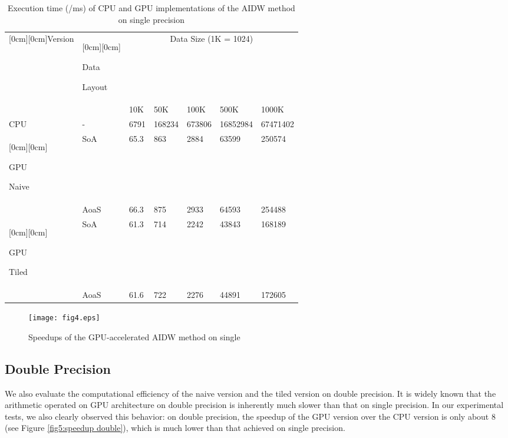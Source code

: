\documentclass[fleqn,11pt]{wlscirep}
\begin{document}
\begin{table}[ht]
\begin{center}
\begin{tabular}{|l|l|l|l|l|l|l|}
			\hline
			\raisebox{-1.50ex}[0cm][0cm]{Version}& 
			\raisebox{-1.50ex}[0cm][0cm]{Data  \par Layout}& 
			\multicolumn{5}{|c|}{Data Size (1K = 1024)}  \\
			\cline{3-7} 
			& 
			& 
			10K& 
			50K& 
			100K& 
			500K& 
			1000K \\
			\hline
			CPU& 
			-& 
			6791& 
			168234& 
			673806& 
			16852984& 
			67471402 \\
			\hline
			\raisebox{-1.50ex}[0cm][0cm]{GPU \par Naive}& 
			SoA& 
			65.3& 
			863& 
			2884& 
			63599& 
			250574 \\
			\cline{2-7} 
			& 
			AoaS& 
			66.3& 
			875& 
			2933& 
			64593& 
			254488 \\
			\hline
			\raisebox{-1.50ex}[0cm][0cm]{GPU \par Tiled}& 
			SoA& 
			61.3& 
			714& 
			2242& 
			43843& 
			168189 \\
			\cline{2-7} 
			& 
			AoaS& 
			61.6& 
			722& 
			2276& 
			44891& 
			172605 \\
			\hline
		\end{tabular}
		\caption{\label{tab1}Execution time (/ms) of CPU and GPU implementations of the AIDW method on single precision}
	\end{center}
\end{table}


\begin{figure}[ht]
	\centering
	\texttt{[image: fig4.eps]}
	\caption{Speedups of the GPU-accelerated AIDW method on single}
	\label{fig4:speedup single}
\end{figure}

\subsection{Double Precision}
We also evaluate the computational efficiency of the naive version and the 
tiled version on double precision. It is widely known that the arithmetic 
operated on GPU architecture on double precision is inherently much slower 
than that on single precision. In our experimental tests, we also clearly 
observed this behavior: on double precision, the speedup of the GPU version 
over the CPU version is only about 8 (see Figure \ref{fig5:speedup double}), which is much lower 
than that achieved on single precision. 
\end{document}

